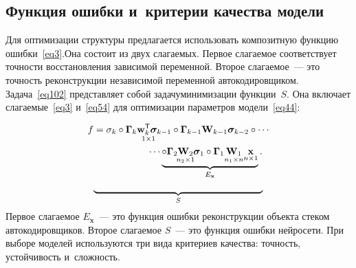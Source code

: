 \begin{multicols}{2}
\section{Функция ошибки и~критерии качества модели}

Для оптимизации структуры предлагается использовать композитную функцию 
ошибки~\eqref{eq3}.\linebreak Она состоит из двух слагаемых. Первое слагаемое 
соответствует точности восстановления зависимой переменной. Второе 
слагаемое~--- это точность реконструкции независимой переменной 
автокодировщиком. Задача~\eqref{eq102} представляет собой задачу\linebreak минимизации 
функции~$S$. Она включает сла\-га\-емые~\eqref{eq3} и~\eqref{eq54} для 
оптимизации параметров модели~\eqref{eq44}:

\noindent
\begin{multline}
f =
\sigma_k\circ\underset{1\times1}
{\boldsymbol\Gamma_k\wm_k^\mathsf{T}\sigmab_{k-1}}\circ\boldsymbol\Gamma_{k-1}
\mathbf{W}_{k-1}\sigmab_{k-2}\circ\cdots\\
\hspace*{20mm}\cdots
\underbrace{\circ\underset{n_2 
\times 
1}{\boldsymbol\Gamma_2\mathbf{W}_2\sigmab_1}\circ\boldsymbol\Gamma_1\underset
{n_1 \times n}{\mathbf{W}_1}\underset{n \times 1}{\x}}_{E_\mathbf{x}}.
\label{eq58}
\end{multline}

\vspace*{-36pt}

$$
\underbrace{\hspace*{62mm}}_{S}
$$
Первое слагаемое $E_{\textbf{x}}$~--- это функция ошибки реконструкции 
объекта стеком автокодировщиков. Второе слагаемое $S$~--- это функция ошибки 
нейросети. При выборе моделей используются три вида критериев качества: 
точность, устойчивость и~сложность.


\end{multicols}
